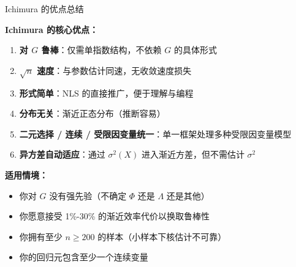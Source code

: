 \documentclass[aspectratio=169, 10pt]{beamer}
\begin{document}
\begin{frame}{Ichimura 的优点总结}

  \begin{highlightbox}
    \textbf{Ichimura 的核心优点：}
    \begin{enumerate}\setlength{\itemsep}{2pt}
      \item \textbf{对 $G$ 鲁棒}：仅需单指数结构，不依赖 $G$ 的具体形式
      \item \textbf{$\sqrt{n}$ 速度}：与参数估计同速，无收敛速度损失
      \item \textbf{形式简单}：NLS 的直接推广，便于理解与编程
      \item \textbf{分布无关}：渐近正态分布（推断容易）
      \item \textbf{二元选择 / 连续 / 受限因变量统一}：单一框架处理多种受限因变量模型
      \item \textbf{异方差自动适应}：通过 $\sigma^2(X)$ 进入渐近方差，但不需估计 $\sigma^2$
    \end{enumerate}
  \end{highlightbox}

  \begin{keybox}
    \textbf{适用情境：}
    \begin{itemize}\setlength{\itemsep}{1pt}
      \item 你对 $G$ 没有强先验（不确定 $\Phi$ 还是 $\Lambda$ 还是其他）
      \item 你愿意接受 1\%-30\% 的渐近效率代价以换取鲁棒性
      \item 你拥有至少 $n \geq 200$ 的样本（小样本下核估计不可靠）
      \item 你的回归元包含至少一个连续变量
    \end{itemize}
  \end{keybox}

\end{frame}
\end{document}
